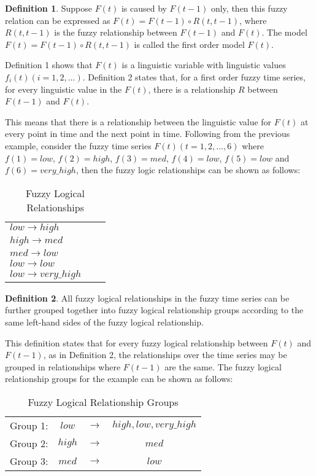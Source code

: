 \documentclass{article}
\theoremstyle{definition}
\newtheorem{ftsdef}{Definition}
\begin{document}
\begin{ftsdef}
Suppose $F(t)$ is caused by $F(t-1)$ only, then this fuzzy relation can be expressed as $F(t)=F(t-1) \circ R(t,t-1)$, where $R(t,t-1)$ is the fuzzy relationship between $F(t-1)$ and $F(t)$. The model $F(t)=F(t-1) \circ R(t,t-1)$ is called the first order model $F(t)$.
\end{ftsdef}

Definition 1 shows that $F(t)$ is a linguistic variable with linguistic values $f_i(t) (i=1,2,\ldots)$. Definition 2 states that, for a first order fuzzy time series, for every linguistic value in the $F(t)$, there is a relationship $R$ between $F(t-1)$ and $F(t)$. 

This means that there is a relationship between the linguistic value for $F(t)$ at every point in time and the next point in time. Following from the previous example, consider the fuzzy time series $F(t)(t=1,2,\ldots,6)$ where $f(1)=low$, $f(2)=high$, $f(3)=med$, $f(4)=low$, $f(5)=low$ and $f(6)=very\_high$, then the fuzzy logic relationships can be shown as follows: 

\begin{table}[h]
	\center
	\begin{tabular}{ l l l }
  	$low \rightarrow high$  \\
  	$high \rightarrow med$ \\
  	$med \rightarrow low$ \\
  	$low \rightarrow low$ \\
  	$low \rightarrow very\_high$ \\
	\end{tabular}
	\caption{Fuzzy Logical Relationships}
\end{table}

\begin{ftsdef}
All fuzzy logical relationships in the fuzzy time series can be further grouped together into fuzzy logical relationship groups according to the same left-hand sides of the fuzzy logical relationship.
\end{ftsdef}

This definition states that for every fuzzy logical relationship between $F(t)$ and $F(t-1)$, as in Definition 2, the relationships over the time series may be grouped in relationships where $F(t-1)$ are the same. The fuzzy logical relationship groups for the example can be shown as follows:

\begin{table}[h]
	\center
	\begin{tabular}{ c c c c }
  	Group 1: & $low$ & $\rightarrow$ & $high, low, very\_high$ \\
  	Group 2: & $high$ & $\rightarrow$ & $med$ \\
  	Group 3: & $med$ & $\rightarrow$ & $low$ \\
	\end{tabular}
	\caption{Fuzzy Logical Relationship Groups}
\end{table}
\end{document}
